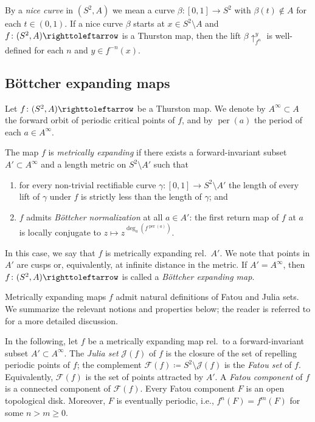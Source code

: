 \documentclass{amsart}
\theoremstyle{plain}
\theoremstyle{definition}
\theoremstyle{remark}
\newcommand{\hide}[1]{}
\renewcommand{\sp}{{\ \ }}
\newcommand{\per}{{\operatorname{per}}}
\newcommand{\Fat}{{\mathcal F}}
\newcommand{\Jul}{{\mathcal J}}
\newcommand\lift[2]{{\uparrow}_{#1}^{#2}}
\newcommand\selfmap{\righttoleftarrow}
\begin{document}
By a \emph{nice curve} in $(S^2,A)$ we mean a curve %
$\beta\colon [0,1]\to S^2$ with $\beta(t)\not\in A$ for each $t\in (0,1)$.  
If a nice curve $\beta$ starts at $x\in S^2\setminus A$ and $f\colon (S^2,A)\selfmap$ is a Thurston map, then the lift $\beta\lift{f^n}{y}$ is well-defined for each $n$ and $y\in f^{-n}(x)$.




\subsection{B\"ottcher expanding maps}
\label{ss:B exp maps}

Let $f\colon (S^2,A)\selfmap$ be a Thurston map. We
denote by $A^\infty\subset A$ the forward orbit of periodic critical points of $f$, and by $\per(a)$ the period of each $a\in A^\infty$. 

\hide{ A
\emph{non-torus} map is a map that is not doubly covered by a torus
endomorphism.}


The map $f$ is \emph{metrically expanding} if there exists a forward-invariant subset $A'\subset A^\infty$ and  a length metric on
  $S^2\setminus A'$ such that
\begin{enumerate}[label=\text{(\roman*)},font=\normalfont,leftmargin=*]
 \item for every non-trivial rectifiable curve
   $\gamma\colon[0,1]\to S^2\setminus A'$ the length of every lift of
   $\gamma$ under $f$ is strictly less than the length of $\gamma$;
   and 
 \item\label{defn:MetrExp:ExpCond} $f$ admits \emph{B\"{o}ttcher normalization} at all $a\in A'$: the first return map of $f$ at $a$ is locally
   conjugate to $z\mapsto z^{\deg_a(f^{\per(a)})}$.\label{defn:MetrExp:NormCond}
 \end{enumerate}
In this case, we say that $f$ is metrically expanding rel.\ $A'$. We note that points in $A'$ are cusps or, equivalently, at infinite distance in the metric.  If $A'=A^\infty$, then $f\colon (S^2,A)\selfmap$ is called a
 \emph{B\"ottcher expanding map}.


Metrically expanding maps $f$ admit natural definitions of Fatou and Julia sets. We summarize the relevant notions and properties below; the reader is referred to \cite{BD_Exp} for a more detailed discussion. 

In the following, let $f$ be a metrically expanding map rel.\ to a forward-invariant subset $A'\subset A^\infty$. 
The \emph{Julia set} $\Jul(f)$ of $f$ is the closure of the set of repelling periodic points of $f$; 
the complement $\Fat(f)\coloneq S^2\setminus \Jul(f)$ is the \emph{Fatou set} of $f$. Equivalently, $\Fat(f)$ is the set of points attracted by $A'$.  A \emph{Fatou component} of $f$ is a connected component of $\Fat(f)$. Every Fatou component $F$ is an open topological disk. Moreover, $F$ is eventually periodic, i.e., $f^n(F)=f^m(F)$ for some $n>m\geq 0$.
\end{document}
